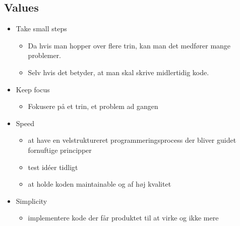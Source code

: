 \documentclass[a4, english]{article}
\begin{document}
\subsection{Values}
\begin{itemize}
  \item Take small steps
  \begin{itemize}
      \item Da hvis man hopper over flere trin, kan man det medfører mange problemer.
      \item Selv hvis det betyder, at man skal skrive midlertidig kode.
  \end{itemize}
  \item Keep focus 
  \begin{itemize}
      \item Fokusere på et trin, et problem ad gangen
  \end{itemize}
  \item Speed 
  \begin{itemize}
      \item at have en velstruktureret programmeringsprocess der bliver guidet fornuftige principper  
      \item test idéer tidligt
      \item at holde koden maintainable og af høj kvalitet 
  \end{itemize}
  \item Simplicity
  \begin{itemize}
      \item implementere kode der får produktet til at virke og ikke mere 
  \end{itemize}
\end{itemize}
\end{document}
